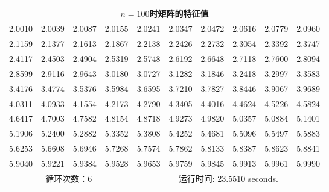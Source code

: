\documentclass{article}
\begin{document}
\begin{table}[H]
	\centering
	\begin{tabular}{|*{10}{c|}}
		\hline
		\multicolumn{10}{|c|}{$n=100$时矩阵的特征值} \\ \hline
		2.0010 & 2.0039 & 2.0087 & 2.0155 & 2.0241 & 2.0347 & 2.0472 & 2.0616 & 2.0779 & 2.0960 \\ \hline
		2.1159 & 2.1377 & 2.1613 & 2.1867 & 2.2138 & 2.2426 & 2.2732 & 2.3054 & 2.3392 & 2.3747 \\ \hline
		2.4117 & 2.4503 & 2.4904 & 2.5319 & 2.5748 & 2.6192 & 2.6648 & 2.7118 & 2.7600 & 2.8094 \\ \hline
		2.8599 & 2.9116 & 2.9643 & 3.0180 & 3.0727 & 3.1282 & 3.1846 & 3.2418 & 3.2997 & 3.3583 \\ \hline
		3.4176 & 3.4774 & 3.5376 & 3.5984 & 3.6595 & 3.7210 & 3.7827 & 3.8446 & 3.9067 & 3.9689 \\ \hline
		4.0311 & 4.0933 & 4.1554 & 4.2173 & 4.2790 & 4.3405 & 4.4016 & 4.4624 & 4.5226 & 4.5824 \\ \hline
		4.6417 & 4.7003 & 4.7582 & 4.8154 & 4.8718 & 4.9273 & 4.9820 & 5.0357 & 5.0884 & 5.1401 \\ \hline
		5.1906 & 5.2400 & 5.2882 & 5.3352 & 5.3808 & 5.4252 & 5.4681 & 5.5096 & 5.5497 & 5.5883 \\ \hline
		5.6253 & 5.6608 & 5.6946 & 5.7268 & 5.7574 & 5.7862 & 5.8133 & 5.8387 & 5.8623 & 5.8841 \\ \hline
		5.9040 & 5.9221 & 5.9384 & 5.9528 & 5.9653 & 5.9759 & 5.9845 & 5.9913 & 5.9961 & 5.9990 \\ \hline
		\multicolumn{4}{|c|}{循环次数：6} & \multicolumn{6}{c|}{运行时间: 23.5510 seconds.} \\ \hline
	\end{tabular}
\end{table}

\end{document}
